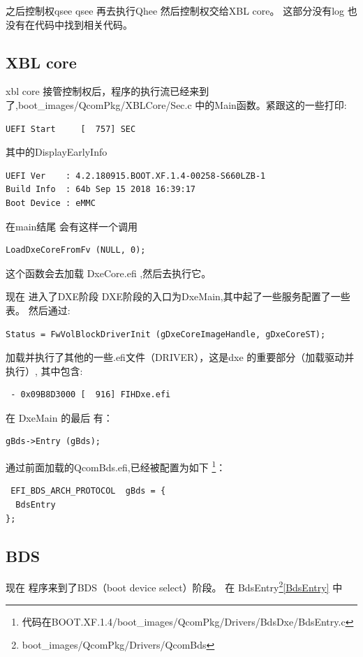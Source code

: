之后控制权qsee qsee 再去执行Qhee 然后控制权交给XBL core。
这部分没有log 也没有在代码中找到相关代码。


\subsection{XBL core}

xbl core 接管控制权后，程序的执行流已经来到了,boot\_images/QcomPkg/XBLCore/Sec.c
中的Main函数。紧跟这的一些打印:
\begin{lstlisting}
UEFI Start     [  757] SEC
\end{lstlisting}
其中的DisplayEarlyInfo
\begin{lstlisting}
UEFI Ver    : 4.2.180915.BOOT.XF.1.4-00258-S660LZB-1
Build Info  : 64b Sep 15 2018 16:39:17
Boot Device : eMMC
\end{lstlisting}

在main结尾 会有这样一个调用
\begin{lstlisting}
LoadDxeCoreFromFv (NULL, 0);
\end{lstlisting}
这个函数会去加载 DxeCore.efi ,然后去执行它。




现在 进入了DXE阶段
DXE阶段的入口为DxeMain,其中起了一些服务配置了一些表。
然后通过:
\begin{lstlisting}
Status = FwVolBlockDriverInit (gDxeCoreImageHandle, gDxeCoreST);
\end{lstlisting}
加载并执行了其他的一些.efi文件（DRIVER），这是dxe 的重要部分（加载驱动并执行）,
其中包含:
\begin{lstlisting}
 - 0x09B8D3000 [  916] FIHDxe.efi
\end{lstlisting}

在 DxeMain 的最后 有：
\begin{lstlisting}
gBds->Entry (gBds);
\end{lstlisting}

通过前面加载的QcomBds.efi,已经被配置为如下
\footnote{代码在BOOT.XF.1.4/boot\_images/QcomPkg/Drivers/BdsDxe/BdsEntry.c}：
\begin{lstlisting}
 EFI_BDS_ARCH_PROTOCOL  gBds = {
  BdsEntry
};
\end{lstlisting}
  
  


 
  
\subsection{BDS}  
现在 程序来到了BDS（boot device select）阶段。 
在 BdsEntry\footnote{boot\_images/QcomPkg/Drivers/QcomBds}\ref{BdsEntry} 中

